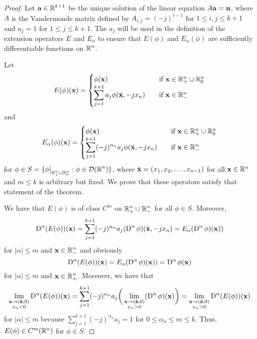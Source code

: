 \begin{proof}
Let $\displaystyle \mathbf{a} \in \mathbb{R}^{k+1}$ be the unique solution of
the linear equation $A \mathbf{a} = \mathbf{u}$, where $A$ is the
Vandermonde matrix defined by $\displaystyle A_{i,j} = (-j)^{i-1}$ for
$1 \leq i,j \leq k+1$ and $u_j = 1$ for $1 \leq j \leq k+1$.  The
$a_j$ will be used in the definition of the extension operators $E$
and $E_\alpha$ to ensure that $E(\phi)$ and $E_\alpha(\phi)$ are
sufficiently differentiable functions on $\displaystyle \mathbb{R}^n$.

Let
\[
E(\phi)(\mathbf{x})
= \begin{cases}
\phi(\mathbf{x}) & \quad \text{if} \ \mathbf{x} \in \mathbb{R}^n_+ \cup \mathbb{R}^n_0 \\
\displaystyle \sum_{j=1}^{k+1} a_j \phi(\breve{\mathbf{x}},-jx_n)
& \quad \text{if} \ \mathbf{x} \in \mathbb{R}^n_-
\end{cases}
\]
and
\[
E_\alpha(\phi)(\mathbf{x})
= \begin{cases}
\phi(\mathbf{x}) & \quad \text{if} \ \mathbf{x} \in \mathbb{R}^n_+ \cup \mathbb{R}^n_0 \\
\displaystyle \sum_{j=1}^{k+1} (-j)^{\alpha_n} a_j \phi(\breve{\mathbf{x}},-jx_n)
& \quad \text{if} \ \mathbf{x} \in \mathbb{R}^n_-
\end{cases}
\]
for $\displaystyle \phi \in S = \{ \phi\big|_{\mathbb{R}^n_+ \cup \mathbb{R}^n_0} :
\phi \in \mathcal{D}(\mathbb{R}^n) \}$,
where $\breve{\mathbf{x}} = (x_1,x_2,\ldots, x_{n-1})$ for all
$\mathbf{x} \in \mathbb{R}^n$ and $m \leq k$ is arbitrary but fixed.  We prove
that these operators satisfy that statement of the theorem.

We have that $E(\phi)$ is of class $\displaystyle C^m$ on
$\displaystyle \mathbb{R}^n_+ \cup \mathbb{R}^n_-$ for all $\phi \in S$.
Moreover,
\[
\operatorname{D}^\alpha (E(\phi))(\mathbf{x}) 
= \sum_{j=1}^{k+1} (-j)^{\alpha_n} a_j (\operatorname{D}^{\alpha} \phi)
(\breve{\mathbf{x}},-jx_n)
= E_\alpha(\operatorname{D}^\alpha \phi)(\mathbf{x}))
\]
for $|\alpha| \leq m$ and $\displaystyle \mathbf{x} \in \mathbb{R}^n_-$ and obviously
\[
\operatorname{D}^\alpha (E(\phi))(\mathbf{x}) = E_\alpha(\operatorname{D}^\alpha \phi)(\mathbf{x}))
= \operatorname{D}^\alpha \phi (\mathbf{x})
\]
for $|\alpha| \leq m$ and $\displaystyle \mathbf{x} \in \mathbb{R}^n_+$.  Moreover,
we have that
\[
\lim_{\substack{\mathbf{x}\to (\breve{\mathbf{z}},0)\\x_n<0}}
\operatorname{D}^\alpha (E(\phi))(\mathbf{x}) 
= \sum_{j=1}^{k+1} (-j)^{\alpha_n} a_j
\bigg( \lim_{\substack{\mathbf{x}\to (\breve{\mathbf{z}},0)\\x_n>0}}
(\operatorname{D}^{\alpha} \phi)(\mathbf{x}) \bigg) =
\lim_{\substack{\mathbf{x}\to (\breve{\mathbf{z}},0)\\x_n>0}}
\operatorname{D}^\alpha (E(\phi))(\mathbf{x})
\]
for $|\alpha| \leq m$
because $\displaystyle \sum_{j=1}^{k+1} (-j)^{\alpha_n}a_j = 1$ for
$0 \leq \alpha_n \leq m \leq k$.  Thus, $E(\phi) \in C^m(\mathbb{R}^n)$ for
$\phi \in S$.


\end{proof}
